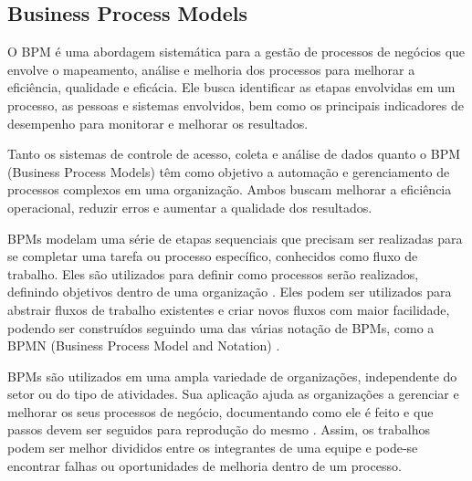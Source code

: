 \subsection{Business Process Models}


O BPM é uma abordagem sistemática para a gestão de processos de negócios que envolve o mapeamento, análise e melhoria dos processos para melhorar a eficiência, qualidade e eficácia. Ele busca identificar as etapas envolvidas em um processo, as pessoas e sistemas envolvidos, bem como os principais indicadores de desempenho para monitorar e melhorar os resultados.


Tanto os sistemas de controle de acesso, coleta e análise de dados quanto o BPM (Business Process Models) têm como objetivo a automação e gerenciamento de processos complexos em uma organização. Ambos buscam melhorar a eficiência operacional, reduzir erros e aumentar a qualidade dos resultados.


BPMs modelam uma série de etapas sequenciais que precisam ser realizadas para se completar uma tarefa ou processo específico, conhecidos como fluxo de trabalho. Eles são utilizados para definir como processos serão realizados, definindo objetivos dentro de uma organização \cite{Alves2014}. Eles podem ser utilizados para abstrair fluxos de trabalho existentes e criar novos fluxos com maior facilidade, podendo ser construídos seguindo uma das várias notação de BPMs, como a BPMN (Business Process Model and Notation) \cite{Dijkman2008}.



BPMs são utilizados em uma ampla variedade de organizações, independente do setor ou do tipo de atividades. Sua aplicação ajuda as organizações a gerenciar e melhorar os seus processos de negócio, documentando como ele é feito e que passos devem ser seguidos para reprodução do mesmo \R. Assim, os trabalhos podem ser melhor divididos entre os integrantes de uma equipe e pode-se encontrar falhas ou oportunidades de melhoria dentro de um processo.

